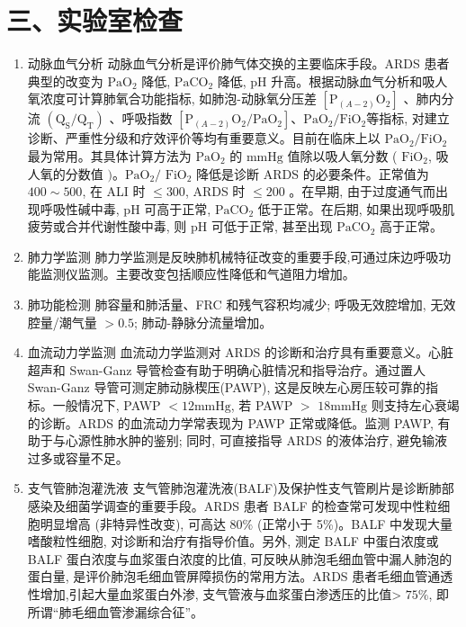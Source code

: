 \documentclass[10pt]{article}
\begin{document}
\section*{三、实验室检查}
\begin{enumerate}
  \item 动脉血气分析 动脉血气分析是评价肺气体交换的主要临床手段。ARDS 患者典型的改变为 $\mathrm{PaO}_{2}$ 降低, $\mathrm{PaCO}_{2}$ 降低, $\mathrm{pH}$ 升高。根据动脉血气分析和吸人氧浓度可计算肺氧合功能指标, 如肺泡-动脉氧分压差 $\left[\mathrm{P}_{(A-2)} \mathrm{O}_{2}\right]$ 、肺内分流 $\left(\mathrm{Q}_{\mathrm{S}} / \mathrm{Q}_{\mathrm{T}}\right)$ 、呼吸指数 $\left[\mathrm{P}_{(A-2)} \mathrm{O}_{2} / \mathrm{PaO}_{2}\right] 、 \mathrm{PaO}_{2} / \mathrm{FiO}_{2}$等指标, 对建立诊断、严重性分级和疗效评价等均有重要意义。目前在临床上以 $\mathrm{PaO}_{2} / \mathrm{FiO}_{2}$ 最为常用。其具体计算方法为 $\mathrm{PaO}_{2}$ 的 $\mathrm{mmHg}$ 值除以吸人氧分数 ( $\mathrm{FiO}_{2}$, 吸人氧的分数值 $) 。 \mathrm{PaO}_{2} /$ $\mathrm{FiO}_{2}$ 降低是诊断 ARDS 的必要条件。正常值为 $400 \sim 500$, 在 ALI 时 $\leqslant 300$, ARDS 时 $\leqslant 200$ 。在早期, 由于过度通气而出现呼吸性碱中毒, $\mathrm{pH}$ 可高于正常, $\mathrm{PaCO}_{2}$ 低于正常。在后期, 如果出现呼吸肌疲劳或合并代谢性酸中毒, 则 $\mathrm{pH}$ 可低于正常, 甚至出现 $\mathrm{PaCO}_{2}$ 高于正常。

  \item 肺力学监测 肺力学监测是反映肺机械特征改变的重要手段,可通过床边呼吸功能监测仪监测。主要改变包括顺应性降低和气道阻力增加。

  \item 肺功能检测 肺容量和肺活量、FRC 和残气容积均减少; 呼吸无效腔增加, 无效腔量/潮气量 $>0.5$; 肺动-静脉分流量增加。

  \item 血流动力学监测 血流动力学监测对 ARDS 的诊断和治疗具有重要意义。心脏超声和 Swan-Ganz 导管检查有助于明确心脏情况和指导治疗。通过置人 Swan-Ganz 导管可测定肺动脉楔压(PAWP), 这是反映左心房压较可靠的指标。一般情况下, PAWP $<12 \mathrm{mmHg}$, 若 PAWP $>$ $18 \mathrm{mmHg}$ 则支持左心衰竭的诊断。ARDS 的血流动力学常表现为 PAWP 正常或降低。监测 PAWP, 有助于与心源性肺水肿的鉴别; 同时, 可直接指导 ARDS 的液体治疗, 避免输液过多或容量不足。

  \item 支气管肺泡灌洗液 支气管肺泡灌洗液(BALF)及保护性支气管刷片是诊断肺部感染及细菌学调查的重要手段。ARDS 患者 BALF 的检查常可发现中性粒细胞明显增高 (非特异性改变), 可高达 $80 \%$ (正常小于 5\%)。BALF 中发现大量嗜酸粒性细胞, 对诊断和治疗有指导价值。另外, 测定 BALF 中蛋白浓度或 BALF 蛋白浓度与血浆蛋白浓度的比值, 可反映从肺泡毛细血管中漏人肺泡的蛋白量, 是评价肺泡毛细血管屏障损伤的常用方法。ARDS 患者毛细血管通透性增加,引起大量血浆蛋白外渗, 支气管液与血浆蛋白渗透压的比值> $75 \%$, 即所谓“肺毛细血管渗漏综合征”。


\end{enumerate}
\end{document}
